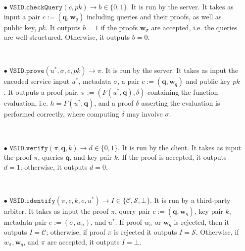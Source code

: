 \begin{definition}
\begin{itemize}



\

\item[$\bullet$] $\mathtt{VSID.checkQuery}(c, pk)\rightarrow b\in\{0,1\}$. It is run by the server. It takes as input a pair $c:=(\bm{q}, \bm{w}_{\scriptscriptstyle q})$ including queries and their proofs, as well as public key, $pk$. It outputs $b = 1$ if the proofs $\bm{w}_{\scriptscriptstyle\sigma}$ are accepted, i.e. the queries are well-structured. Otherwise, it outputs $b = 0$.

\

\item[$\bullet$] $\mathtt{VSID.prove}(u^{\scriptscriptstyle *},\sigma,c,pk)\rightarrow \pi$. It is run by the server. It takes as input the  encoded service input $u^{\scriptscriptstyle *}$, metadata $\sigma$, a pair $c:=(\bm{q},\bm{w}_{\scriptscriptstyle q})$ and public key $pk$. It outputs a proof pair, $\pi:=(F(u^{\scriptscriptstyle *},\bm{q}),\delta)$ containing the function evaluation, i.e. $h=F(u^{\scriptscriptstyle *},\bm{q})$, and a proof $\delta$ asserting the evaluation is performed correctly, where computing $\delta$ may involve $\sigma$.




\

\item[$\bullet$] $\mathtt{VSID.verify}(\pi, \bm{q}, k)\rightarrow d\in\{0,1\}$. It is run by the client. It takes as input the proof $\pi$, queries $\bm{q}$, and key pair $k$. If the proof is accepted, it outputs $d=1$; otherwise, it outputs $d=0$. 

\

\item[$\bullet$]  $\mathtt{VSID.identify}(\pi,c,k,e,u^{\scriptscriptstyle *})\rightarrow I\in \{ \mathcal{C},\mathcal{S},\bot\}$. It is run by a third-party arbiter. It takes as input the proof $\pi$, query pair $c:=(\bm{q},\bm{w}_{\scriptscriptstyle q})$,  key pair $k$, metadata pair  $e:=(\sigma,w_{\sigma})$, and $u^{\scriptscriptstyle *}$. If   proof $w_{\scriptscriptstyle\sigma}$ or $\bm{w}_{\scriptscriptstyle q}$  is rejected, then it outputs $I=\mathcal C$; otherwise, if proof $\pi$ is rejected it outputs $I=\mathcal S$.  Otherwise, if  $w_{\scriptscriptstyle\sigma}, \bm{w}_{\scriptscriptstyle q}$, and $\pi$ are accepted, it outputs   $I=\bot$. 



\end{itemize}
\end{definition}


